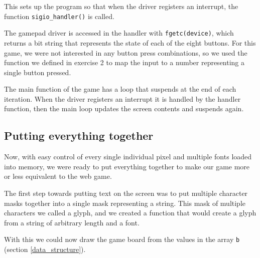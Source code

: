 

This sets up the program so that when the driver registers an interrupt, the function \texttt{sigio\_handler()} is called.


The gamepad driver is accessed in the handler with \texttt{fgetc(device)}, which returns a bit string that represents the state of each of the eight buttons.
For this game, we were not interested in any button press combinations, so we used the function we defined in exercise 2 to map the input to a number representing a single button pressed.



The main function of the game has a loop that suspends at the end of each iteration.
When the driver registers an interrupt it is handled by the handler function, then the main loop updates the screen contents and suspends again.

\newpage


\newpage


\newpage
\subsection{Putting everything together}
Now, with easy control of every single individual pixel and multiple fonts loaded into memory, we were ready to put everything together to make our game more or less equivalent to the web game.

The first step towards putting text on the screen was to put multiple character masks together into a single mask representing a string.
This mask of multiple characters we called a glyph, and we created a function that would create a glyph from a string of arbitrary length and a font.



\newpage
With this we could now draw the game board from the values in the array \texttt{b} (section \ref{data_structure}).

